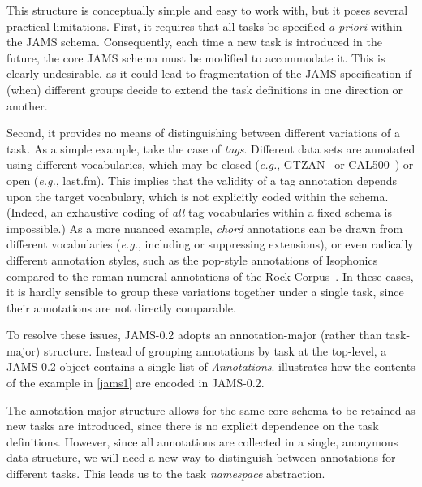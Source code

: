 \documentclass{article}
\begin{document}
This structure is conceptually simple and easy to work with, but it poses several practical limitations.
First, it requires that all tasks be specified \emph{a priori} within the JAMS schema.
Consequently, each time a new task is introduced in the future, the core JAMS schema must be modified to accommodate it.
This is clearly undesirable, as it could lead to fragmentation of the JAMS specification if (when) different groups decide to extend the task definitions in one direction or another.

Second, it provides no means of distinguishing between different variations of a task.
As a simple example, take the case of \emph{tags}.
Different data sets are annotated using different vocabularies, which may be closed
(\emph{e.g.}, GTZAN~\cite{gtzan} or CAL500~\cite{cal500}) or open (\emph{e.g.}, last.fm).
This implies that the validity of a tag annotation depends upon the target vocabulary, which is not explicitly coded within the schema.
(Indeed, an exhaustive coding of \emph{all} tag vocabularies within a fixed schema is impossible.) 
As a more nuanced example, \emph{chord} annotations can be drawn from different vocabularies (\emph{e.g.}, including or suppressing extensions),
or even radically different annotation styles, such as the pop-style annotations of
Isophonics~\cite{isophonicsbeatles} compared to the roman numeral annotations of the
Rock Corpus~\cite{de2011corpus}.
In these cases, it is hardly sensible to group these variations together under a single task, since their annotations are not directly
comparable.

To resolve these issues, JAMS-0.2 adopts an an\-notation-major (rather than task-major) structure.
Instead of grouping annotations by task at the top-level, a JAMS-0.2 object contains a single list of \emph{Annotations}.
 illustrates how the contents of the example in \cref{jams1} are encoded in
JAMS-0.2.

The annotation-major structure allows for the same core schema to be retained as new tasks 
are introduced, since there is no explicit dependence on the task definitions.
However, since all annotations are collected in a single, anonymous data structure, we will need a new way to distinguish between annotations for different tasks.
This leads us to the task \emph{namespace} abstraction.
\end{document}
